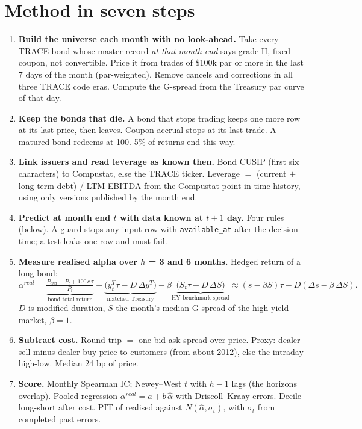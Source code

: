 \documentclass[11pt,a4paper]{article}
\newcommand{\code}[1]{\texttt{\small #1}}
\begin{document}
\section{Method in seven steps}
\begin{enumerate}
\item \textbf{Build the universe each month with no look-ahead.} Take every TRACE bond whose master record \emph{at that month end} says grade H, fixed coupon, not convertible. Price it from trades of \$100k par or more in the last 7 days of the month (par-weighted). Remove cancels and corrections in all three TRACE code eras. Compute the G-spread from the Treasury par curve of that day.
\item \textbf{Keep the bonds that die.} A bond that stops trading keeps one more row at its last price, then leaves. Coupon accrual stops at its last trade. A matured bond redeems at 100. 5\% of returns end this way.
\item \textbf{Link issuers and read leverage as known then.} Bond CUSIP (first six characters) to Compustat, else the TRACE ticker. Leverage $=$ (current $+$ long-term debt) $/$ LTM EBITDA from the Compustat point-in-time history, using only versions published by the month end.
\item \textbf{Predict at month end $t$ with data known at $t+1$ day.} Four rules (below). A guard stops any input row with \code{available\_at} after the decision time; a test leaks one row and must fail.
\item \textbf{Measure realised alpha over $h$ = 3 and 6 months.} Hedged return of a long bond:
\[
\alpha^{real} = \underbrace{\tfrac{P_{end} - P_t + 100\,c\,\tau}{P_t}}_{\text{bond total return}} - \underbrace{\big(y^T_t \tau - D\,\Delta y^T\big)}_{\text{matched Treasury}} - \beta\underbrace{\big(S_t \tau - D\,\Delta S\big)}_{\text{HY benchmark spread}} \approx (s-\beta S)\tau - D(\Delta s - \beta\,\Delta S).
\]
$D$ is modified duration, $S$ the month's median G-spread of the high yield market, $\beta = 1$.
\item \textbf{Subtract cost.} Round trip $=$ one bid-ask spread over price. Proxy: dealer-sell minus dealer-buy price to customers (from about 2012), else the intraday high-low. Median 24 bp of price.
\item \textbf{Score.} Monthly Spearman IC; Newey--West $t$ with $h-1$ lags (the horizons overlap). Pooled regression $\alpha^{real} = a + b\,\hat\alpha$ with Driscoll--Kraay errors. Decile long-short after cost. PIT of realised against $N(\hat\alpha, \sigma_t)$, with $\sigma_t$ from completed past errors.
\end{enumerate}
\end{document}
